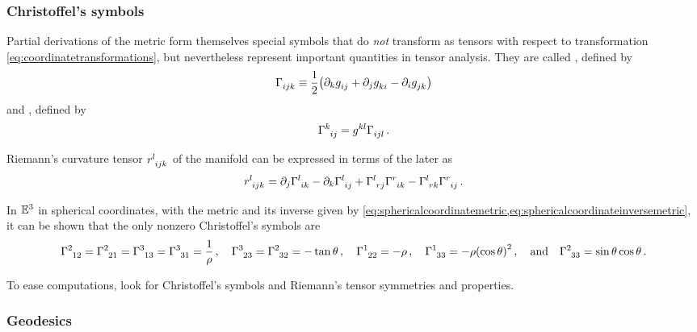 \subsubsection{Christoffel's symbols}
%
Partial derivations of the metric form themselves special symbols that do \emph{not} transform as tensors with respect to transformation \cref{eq:coordinatetransformations}, but nevertheless represent important quantities in tensor analysis. They are called , defined by
%
\begin{equation*}
  \fkchris ijk \defas \dfrac{1}{2}\parens{\ipd k\tcovmet ij + \ipd j\tcovmet ki - \ipd i\tcovmet jk}
\end{equation*}
%
and , defined by
%
\begin{equation*}
  \skchris kij = \tvecmet kl\fkchris ijl\,.
\end{equation*}

Riemann's curvature tensor $\triemann lijk$ of the manifold can be expressed in terms of the later as
%
\begin{equation*}
  \triemann lijk = \ipd j\skchris lik - \ipd k\skchris lij + \skchris lrj\skchris rik - \skchris lrk\skchris rij\,.
\end{equation*}


\begin{example}
  In $\mathbb{E}^{3}$ in spherical coordinates, with the metric and its inverse given by \cref{eq:sphericalcoordinatemetric,eq:sphericalcoordinateinversemetric}, it can be shown that the only nonzero Christoffel's symbols are
  \begin{equation}\label{eq:sphericalcoordinateschristoffelsymbols}
    \skchris 212 = \skchris 221 = \skchris 313 = \skchris 331 = \dfrac{1}{\sxpos} \,,\quad
    \skchris 323 = \skchris 232 = -\tan\sypos \,,\quad
    \skchris 122 = -\sxpos \,,\quad 
    \skchris 133 = -\sxpos\parens{\cos\sypos}^2 \,,\quad\text{and}\quad
    \skchris 233 = \sin\sypos\cos\sypos \,.
  \end{equation}
\end{example}


\begin{note}
  To ease computations, look for Christoffel's symbols and Riemann's tensor symmetries and properties.
\end{note}


\subsubsection{Geodesics}

